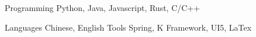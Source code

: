 


\begin{cvskills}


\cvskill
{Programming} %
{Python, Java, Javascript, Rust, C/C++} %




\cvskill
{Languages} %
{Chinese, English} %
\cvskill
{Tools}
{Spring, K Framework, UI5, LaTex}

\end{cvskills}